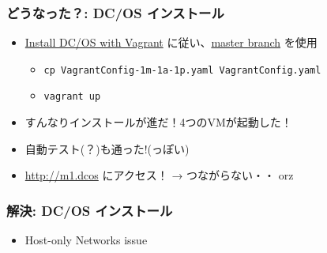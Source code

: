 \documentclass[aspectratio=169,11pt,hyperref={colorlinks=true}]{beamer}
\begin{document}
\begin{frame}
  \frametitle{どうなった？: DC/OS インストール}
  \begin{itemize}
    \item \href{https://dcos.io/docs/1.9/installing/local/}{Install DC/OS with Vagrant} に従い、\href{https://github.com/dcos/dcos-vagrant/}{master branch} を使用
    \begin{itemize}
      \item \lstinline[basicstyle=\ttfamily\footnotesize,columns=fixed]{cp VagrantConfig-1m-1a-1p.yaml VagrantConfig.yaml}
      \item \lstinline[basicstyle=\ttfamily\footnotesize,columns=fixed]{vagrant up}
    \end{itemize}
    \item すんなりインストールが進だ！4つのVMが起動した！
    \item 自動テスト(？)も通った!(っぽい)
    \item \url{http://m1.dcos} にアクセス！ → つながらない・・ orz
  \end{itemize}
\end{frame}

\begin{frame}
  \frametitle{解決: DC/OS インストール}
  \begin{itemize}
    \item Host-only Networks issue
      
  \end{itemize}
\end{frame}
\end{document}
